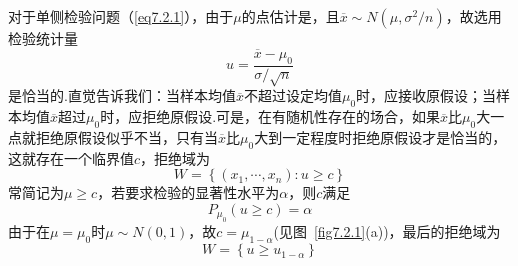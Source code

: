 对于单侧检验问题（\ref{eq7.2.1}），由于$\mu $的点估计是，且$\overline { x } \sim N \left( \mu , \sigma ^ { 2 } / n \right)$，故选用检验统计量
\begin{equation}\label{eq7.2.4}
u = \frac { \overline { x } - \mu _ { 0 } } { \sigma / \sqrt { n } }
\end{equation}
是恰当的.直觉告诉我们：当样本均值$\overline{x}$不超过设定均值$\mu_{ 0 }$时，应接收原假设；当样本均值$\overline{x}$超过$\mu_{ 0 }$时，应拒绝原假设.可是，在有随机性存在的场合，如果$\overline{x}$比$\mu_{ 0 }$大一点就拒绝原假设似乎不当，只有当$\overline{x}$比$\mu_{ 0 }$大到一定程度时拒绝原假设才是恰当的，这就存在一个临界值$c$，拒绝域为
\begin{equation}\label{eq7.2.5}
W = \left\{ \left( x _ { 1 } , \cdots , x _ { n } \right) : u \geq c \right\}
\end{equation}
常简记为${\mu \geq c}$，若要求检验的显著性水平为$\alpha$，则$c$满足
\[P _ { \mu _ { 0 } } ( u \geq c ) = \alpha\]
由于在$\mu =\mu_{0}$时$\mu \sim N(0,1)$，故$c=\mu _{1-\alpha}$(见图~\ref{fig7.2.1}(a))，最后的拒绝域为
\begin{equation}\label{eq7.2.6}
W = \left\lbrace  u \geq u _ { 1 - \alpha }\right\rbrace
\end{equation}
